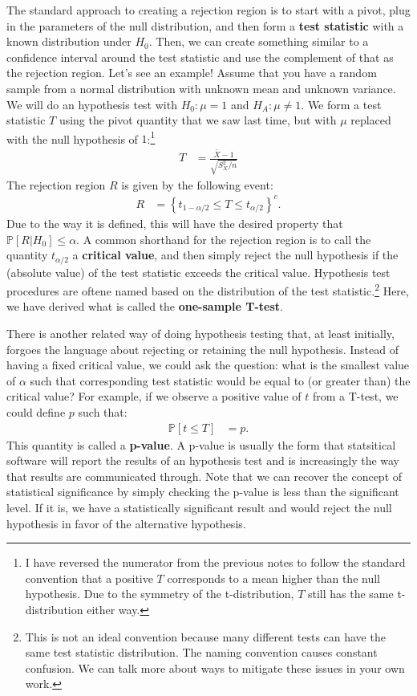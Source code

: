 \documentclass{tufte-handout}
\newcommand{\Prob}{\mathbb{P}}
\begin{document}
The standard approach to creating a rejection region is to start with a
pivot, plug in the parameters of the null distribution, and then form a
\textbf{test statistic} with a known distribution under $H_0$. Then, we
can create something similar to a confidence interval around the test
statistic and use the complement of that as the rejection region. Let's
see an example! Assume that you have a random sample from a normal 
distribution with unknown mean and unknown variance. We will do an 
hypothesis test with $H_0: \mu = 1$ and $H_A: \mu \neq 1$. We form a
test statistic $T$ using the pivot quantity that we saw last time, but
with $\mu$ replaced with the null hypothesis of $1$:\footnote{
  I have reversed the numerator from the previous notes to follow
  the standard convention that a positive $T$ corresponds to a mean
  higher than the null hypothesis. Due to the symmetry of the
  t-distribution, $T$ still has the same t-distribution either way.
}
\begin{align*}
T &= \frac{\bar{X} - 1}{\sqrt{S_X^2 / n}} 
\end{align*}
The rejection region $R$ is given by the following event:
\begin{align*}
R &= \left\{ t_{1 - \alpha/2} \leq T \leq t_{\alpha/2} \right\}^{c}.
\end{align*}
Due to the way it is defined, this will have the desired property that
$\Prob[R|H_0] \leq \alpha$. A common shorthand for the rejection
region is to call the quantity $t_{\alpha/2}$ a \textbf{critical value},
and then simply reject the null hypothesis if the (absolute value) of the
test statistic exceeds the critical value. Hypothesis test procedures
are oftene named based on the distribution of the test statistic.\footnote{
  This is not an ideal convention because many different tests can have
  the same test statistic distribution. The naming convention causes constant
  confusion. We can talk more about ways to mitigate these issues in your own
  work.
}
Here, we have derived what is called the \textbf{one-sample T-test}. 

\vspace*{20pt}

\noindent
There is another related way of doing hypothesis testing that, at least
initially, forgoes the language about rejecting or retaining the null 
hypothesis. Instead of having a fixed critical value, we could ask the
question: what is the smallest value of $\alpha$ such that corresponding
test statistic would be equal to (or greater than) the critical value? 
For example, if we observe a positive value of $t$ from a T-test, we could
define $p$ such that: 
\begin{align*}
\Prob[t \leq T] &= p. 
\end{align*}
This quantity is called a \textbf{p-value}. A p-value is usually the 
form that statsitical software will report the results of an hypothesis
test and is increasingly the way that results are communicated through.
Note that we can recover the concept of statistical significance by 
simply checking the p-value is less than the significant level. If it
is, we have a statistically significant result and would reject the null
hypothesis in favor of the alternative hypothesis.
\end{document}
